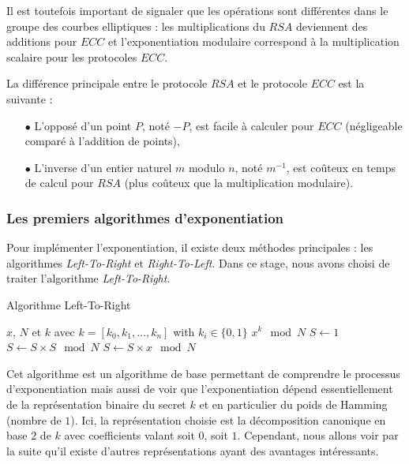 \documentclass[12pt, a4paper]{memoir}
\begin{document}
Il est toutefois important de signaler que les opérations sont différentes dans le groupe des courbes elliptiques : 
les multiplications du $RSA$ deviennent des additions pour $ECC$ et l'exponentiation modulaire correspond
à la multiplication scalaire pour les protocoles $ECC$.

La différence principale entre le protocole $RSA$ et le protocole $ECC$ est la suivante :
\begin{itemize}
 \item [$\bullet$] L'opposé d'un point $P$, noté $-P$, est facile à calculer pour $ECC$ 
 (négligeable comparé à l'addition de points),
 \item [$\bullet$] L'inverse d'un entier naturel $m$ modulo $n$, noté $m^{-1}$, 
 est coûteux en temps de calcul pour $RSA$ (plus coûteux que la multiplication modulaire).
\end{itemize}

\subsubsection{Les premiers algorithmes d'exponentiation}

Pour implémenter l'exponentiation, il existe deux méthodes principales : les algorithmes \emph{Left-To-Right} et \emph{Right-To-Left}.
Dans ce stage, nous avons choisi de traiter l'algorithme \emph{Left-To-Right}.

\begin{algorithm}
 \caption{Algorithme Left-To-Right}
 \begin{algorithmic}
  \REQUIRE $x$, $N$ et $k$ avec $k = [k_0,k_1,\ldots,k_n]$ with $k_i \in \{0,1\}$
  \ENSURE $x^k \mod N$
  \STATE $S \leftarrow 1$
  \STATE $S \leftarrow S \times S \mod N$
  \STATE $S \leftarrow S \times x \mod N$
  \ENDIF
  \ENDFOR
 \end{algorithmic}
\end{algorithm}

Cet algorithme est un algorithme de base permettant de comprendre le processus d'exponentiation mais aussi
de voir que l'exponentiation dépend essentiellement de la représentation binaire du secret $k$
et en particulier du poids de Hamming (nombre de $1$).
Ici, la représentation choisie est la décomposition canonique en base $2$ de $k$ avec coefficients valant soit $0$, soit $1$.
Cependant, nous allons voir par la suite qu'il existe d'autres représentations ayant des avantages intéressants. 
\end{document}

